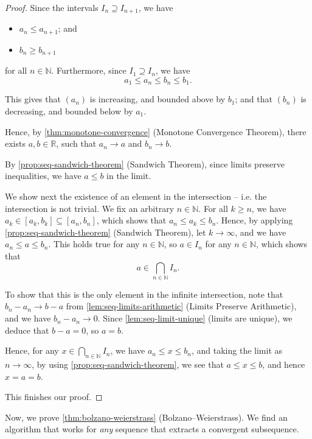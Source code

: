 \documentclass[11pt]{article}
\numberwithin{equation}{section}
\theoremstyle{definition}
\theoremstyle{remark}
\newcommand{\pqty}[1]{\left(#1\right)}
\newcommand{\ccintv}[2]{[#1,#2]}
\newcommand{\RR}{\mathbb R}
\newcommand{\NN}{\mathbb N}
\begin{document}
\begin{proof}
    Since the intervals \(I_n \supseteq I_{n + 1}\), we have
    \begin{itemize}
        \item \(a_n \leq a_{n + 1}\); and
        \item \(b_n \geq b_{n + 1}\)
    \end{itemize}
    for all \(n \in \NN\). Furthermore, since \(I_1 \supseteq I_n\), we have
    \[
        a_1 \leq a_n \leq b_n \leq b_1.
    \]

    This gives that \(\pqty{a_n}\) is increasing, and bounded above by \(b_1\); and that \(\pqty{b_n}\) is decreasing, and bounded below by \(a_1\).

    Hence, by \autoref{thm:monotone-convergence} (Monotone Convergence Theorem), there exists \(a, b \in \RR\), such that \(a_n \to a\) and \(b_n \to b\).
    
    By \autoref{prop:seq-sandwich-theorem} (Sandwich Theorem), since limits preserve inequalities, we have \(a \leq b\) in the limit.

    We show next the existence of an element in the intersection -- i.e. the intersection is not trivial. We fix an arbitrary \(n \in \NN\). For all \(k \geq n\), we have \(a_k \in \ccintv{a_k}{b_k} \subseteq \ccintv{a_n}{b_n}\), which shows that \(a_n \leq a_k \leq b_n\). Hence, by applying \autoref{prop:seq-sandwich-theorem} (Sandwich Theorem), let \(k \to \infty\), and we have \(a_n \leq a \leq b_n\). This holds true for any \(n \in \NN\), so \(a \in I_n\) for any \(n \in \NN\), which shows that
    \[
        a \in \bigcap_{n \in \NN} I_n.
    \]

    To show that this is the only element in the infinite intersection, note that \(b_n - a_n \to b - a\) from \autoref{lem:seq-limits-arithmetic} (Limits Preserve Arithmetic), and we have \(b_n - a_n \to 0\). Since \autoref{lem:seq-limit-unique} (limits are unique), we deduce that \(b - a = 0\), so \(a = b\).

    Hence, for any \(x \in \bigcap_{n \in \NN} I_n\), we have \(a_n \leq x \leq b_n\), and taking the limit as \(n \to \infty\), by using \autoref{prop:seq-sandwich-theorem}, we see that \(a \leq x \leq b\), and hence \(x = a = b\).

    This finishes our proof.
\end{proof}

Now, we prove \autoref{thm:bolzano-weierstrass} (Bolzano--Weierstrass). We find an algorithm that works for \emph{any} sequence that extracts a convergent subsequence.
\end{document}
